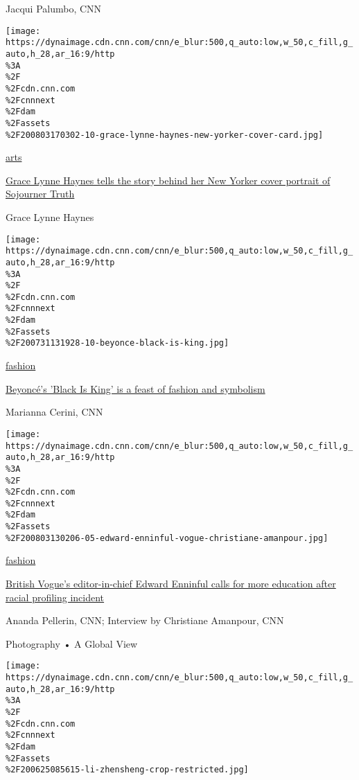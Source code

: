 Jacqui Palumbo, CNN

\href{/style/article/grace-lynne-haynes-new-yorker-cover-sojourner-truth/index.html}{}

\texttt{[image: https://dynaimage.cdn.cnn.com/cnn/e\_blur:500,q\_auto:low,w\_50,c\_fill,g\_auto,h\_28,ar\_16:9/http\\\%3A\\\%2F\\\%2Fcdn.cnn.com\\\%2Fcnnnext\\\%2Fdam\\\%2Fassets\\\%2F200803170302-10-grace-lynne-haynes-new-yorker-cover-card.jpg]}

\href{/style/arts}{arts}

\href{/style/article/grace-lynne-haynes-new-yorker-cover-sojourner-truth/index.html}{Grace
Lynne Haynes tells the story behind her New Yorker cover portrait of
Sojourner Truth}

Grace Lynne Haynes

\href{/style/article/black-is-king-beyonce-fashion/index.html}{}

\texttt{[image: https://dynaimage.cdn.cnn.com/cnn/e\_blur:500,q\_auto:low,w\_50,c\_fill,g\_auto,h\_28,ar\_16:9/http\\\%3A\\\%2F\\\%2Fcdn.cnn.com\\\%2Fcnnnext\\\%2Fdam\\\%2Fassets\\\%2F200731131928-10-beyonce-black-is-king.jpg]}

\href{/style/fashion}{fashion}

\href{/style/article/black-is-king-beyonce-fashion/index.html}{Beyoncé's
'Black Is King' is a feast of fashion and symbolism}

Marianna Cerini, CNN

\href{/style/article/edward-enninful-vogue-christiane-amanpour/index.html}{}

\texttt{[image: https://dynaimage.cdn.cnn.com/cnn/e\_blur:500,q\_auto:low,w\_50,c\_fill,g\_auto,h\_28,ar\_16:9/http\\\%3A\\\%2F\\\%2Fcdn.cnn.com\\\%2Fcnnnext\\\%2Fdam\\\%2Fassets\\\%2F200803130206-05-edward-enninful-vogue-christiane-amanpour.jpg]}

\href{/style/fashion}{fashion}

\href{/style/article/edward-enninful-vogue-christiane-amanpour/index.html}{British
Vogue's editor-in-chief Edward Enninful calls for more education after
racial profiling incident}

Ananda Pellerin, CNN; Interview by Christiane Amanpour, CNN

Photography • A Global View

\href{/style/article/li-zhensheng-cultural-revolution/index.html}{}

\texttt{[image: https://dynaimage.cdn.cnn.com/cnn/e\_blur:500,q\_auto:low,w\_50,c\_fill,g\_auto,h\_28,ar\_16:9/http\\\%3A\\\%2F\\\%2Fcdn.cnn.com\\\%2Fcnnnext\\\%2Fdam\\\%2Fassets\\\%2F200625085615-li-zhensheng-crop-restricted.jpg]}

